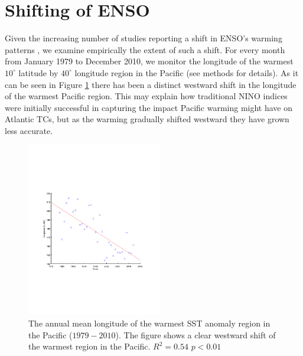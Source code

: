 \section{Shifting of ENSO}
Given the increasing number of studies reporting a shift in ENSO's warming patterns \cite{ashok2007, kao2009contrasting, yeh2009,kug2009two, kim2009}, we examine empirically the extent of such a shift. For every month from January 1979 to December 2010, we monitor the longitude of the warmest $10^\circ$ latitude by $40^\circ$ longitude region in the Pacific (see methods for details). As it can be seen in Figure \ref{fig:figures_scatter} there has been a distinct westward shift in the longitude of the warmest Pacific region. This may explain how traditional NINO indices were initially successful in capturing the impact Pacific warming might have on Atlantic TCs, but as the warming gradually shifted westward they have grown less accurate.

\begin{figure}[htbp]
	\centering
		\includegraphics[height=3in]{figures/scatter.pdf}
	\caption{The annual mean longitude of the warmest SST anomaly region in the Pacific ($1979-2010$). The figure shows a clear westward shift of the warmest region in the Pacific. $R^2 = 0.54$ $p < 0.01$}
	\label{fig:figures_scatter}
\end{figure}


\newpage